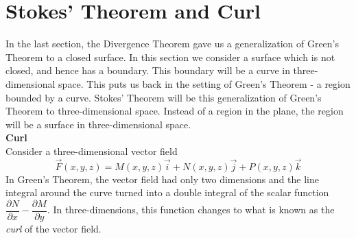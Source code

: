 \section{Stokes' Theorem and Curl}\label{sec:stokes_theorem}

In the last section, the Divergence Theorem gave us a generalization of Green's Theorem to a closed surface. In this section we consider a surface which is not closed, and hence has a boundary.  This boundary will be a curve in three-dimensional space. This puts us back in the setting of Green's Theorem - a region bounded by a curve. Stokes' Theorem will be this generalization of Green's Theorem to three-dimensional space. Instead of a region in the plane, the region will be a surface in three-dimensional space.\\

\noindent\textbf{\large Curl}\\

Consider a three-dimensional vector field $$\vec F(x,y,z) = M(x,y,z) \vec i + N(x,y,z) \vec j + P(x,y,z) \vec k$$ In Green's Theorem, the vector field had only two dimensions and the line integral around the curve turned into a double integral of the scalar function $\dfrac{\partial N}{\partial x} - \dfrac{\partial M}{\partial y}$.  In three-dimensions, this function changes to what is known as the \emph{curl} of the vector field.\\

\\

